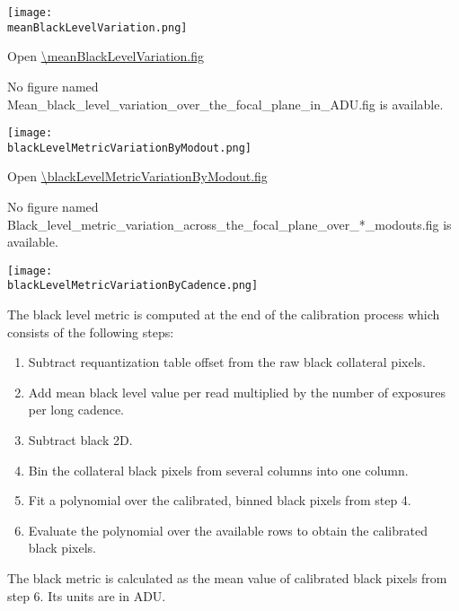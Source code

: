 \begin{center}
  \texttt{[image: \\meanBlackLevelVariation.png]}
\end{center}

\meanBlackLevelVariationCaption

Open \url{\meanBlackLevelVariation.fig}

\else
No figure named
Mean\_black\_level\_variation\_over\_the\_focal\_plane\_in\_ADU.fig is
available.
\fi
\clearpage

\ifdefined \blackLevelMetricVariationByModout

\begin{center}
  \texttt{[image: \\blackLevelMetricVariationByModout.png]}
\end{center}

\blackLevelMetricVariationByModoutCaption

Open \url{\blackLevelMetricVariationByModout.fig}

\else
No figure named
Black\_level\_metric\_variation\_across\_the\_focal\_plane\_over\_*\_modouts.fig is
available.
\fi
\clearpage

\ifdefined \blackLevelMetricVariationByCadence

\begin{center}
  \texttt{[image: \\blackLevelMetricVariationByCadence.png]}
\end{center}

The black level metric is computed at the end of the calibration
process which consists of the following steps:

\begin{enumerate}
\item
  Subtract requantization table offset from the raw black collateral
  pixels.
\item
  Add mean black level value per read multiplied by the number of
  exposures per long cadence.
\item
  Subtract black 2D.
\item
  Bin the collateral black pixels from several columns into one column.
\item
  Fit a polynomial over the calibrated, binned black pixels from step 4.
\item
  Evaluate the polynomial over the available rows to obtain the
  calibrated black pixels.
\end{enumerate}

The black metric is calculated as the mean value of calibrated black
pixels from step 6. Its units are in ADU.

